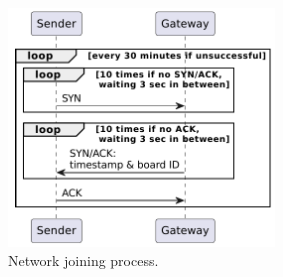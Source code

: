 \begin{figure}[ht]
    \centering
    \includegraphics[width=200pt]{uml/network_joining.pdf}
    \caption{Network joining process.}
    \label{img: network joining}
\end{figure}

